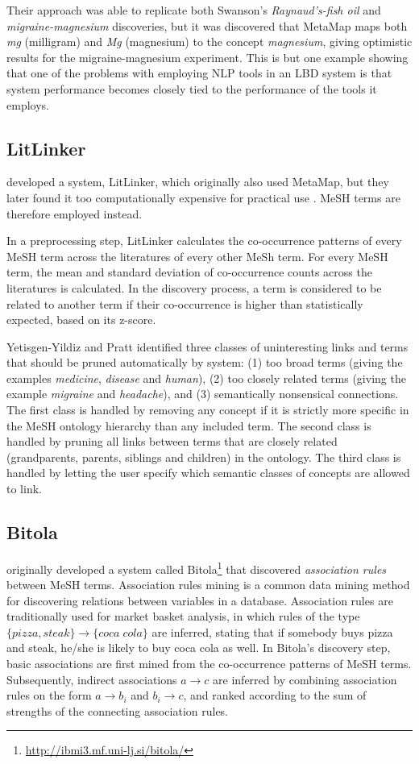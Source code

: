 Their approach was able to replicate both Swanson's \emph{Raynaud's-fish oil} and \emph{migraine-magnesium} discoveries, but it was discovered that MetaMap maps both \emph{mg} (milligram) and \emph{Mg} (magnesium) to the concept \emph{magnesium}, giving optimistic results for the migraine-magnesium experiment. This is but one example showing that one of the problems with employing NLP tools in an LBD system is that system performance becomes closely tied to the performance of the tools it employs.

\subsection{LitLinker}

\citet{pra03} developed a system, LitLinker, which originally also used MetaMap, but they later found it too computationally expensive for practical use \cite{yet06}. MeSH terms are therefore employed instead.

In a preprocessing step, LitLinker calculates the co-occurrence patterns of every MeSH term across the literatures of every other MeSh term. For every MeSH term, the mean and standard deviation of co-occurrence counts across the literatures is calculated. In the discovery process, a term is considered to be related to another term if their co-occurrence is higher than statistically expected, based on its z-score.

Yetisgen-Yildiz and Pratt identified three classes of uninteresting links and terms that should be pruned automatically by system: (1) too broad terms (giving the examples \emph{medicine}, \emph{disease} and \emph{human}), (2) too closely related terms (giving the example \emph{migraine} and \emph{headache}), and (3) semantically nonsensical connections. The first class is handled by removing any concept if it is strictly more specific in the MeSH ontology hierarchy than any included term. The second class is handled by pruning all links between terms that are closely related (grandparents, parents, siblings and children) in the ontology. The third class is handled by letting the user specify which semantic classes of concepts are allowed to link.

\subsection{Bitola}

\citet{hri01} originally developed a system called Bitola\footnote{\url{http://ibmi3.mf.uni-lj.si/bitola/}} that discovered \emph{association rules} between MeSH terms. Association rules mining is a common data mining method for discovering relations between variables in a database. Association rules are traditionally used for market basket analysis, in which rules of the type $\{pizza,steak\}\to\{coca\;cola\}$ are inferred, stating that if somebody buys pizza and steak, he/she is likely to buy coca cola as well. In Bitola's discovery step, basic associations are first mined from the co-occurrence patterns of MeSH terms. Subsequently, indirect associations $a \to c$ are inferred by combining association rules on the form $a \to b_i$ and $b_i \to c$, and ranked according to the sum of strengths of the connecting association rules.

